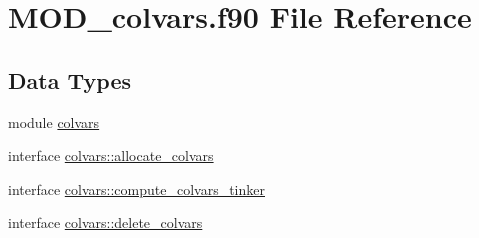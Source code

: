 \hypertarget{MOD__colvars_8f90}{\section{M\-O\-D\-\_\-colvars.\-f90 File Reference}
\label{MOD__colvars_8f90}
}
\subsection*{Data Types}
\begin{DoxyCompactItemize}
\item 
module \hyperlink{classcolvars}{colvars}
\item 
interface \hyperlink{interfacecolvars_1_1allocate__colvars}{colvars\-::allocate\-\_\-colvars}
\item 
interface \hyperlink{interfacecolvars_1_1compute__colvars__tinker}{colvars\-::compute\-\_\-colvars\-\_\-tinker}
\item 
interface \hyperlink{interfacecolvars_1_1delete__colvars}{colvars\-::delete\-\_\-colvars}
\end{DoxyCompactItemize}
